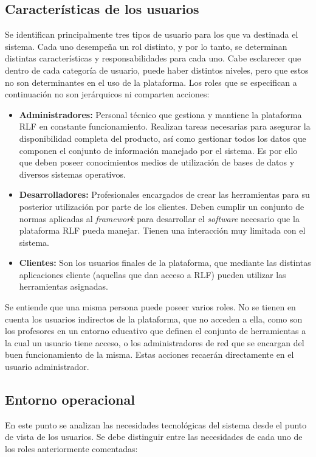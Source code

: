 \subsection{Características de los usuarios}
Se identifican principalmente tres tipos de usuario para los que va 
destinada el sistema. Cada uno desempeña un rol distinto, y por lo 
tanto, se determinan distintas características y responsabilidades 
para cada uno. Cabe esclarecer que dentro de cada categoría de 
usuario, puede haber distintos niveles, pero que estos no son 
determinantes en el uso de la plataforma. Los roles que se especifican 
a continuación no son jerárquicos ni comparten acciones:

\begin{itemize}
\item \textbf{Administradores:} Personal técnico que gestiona y 
mantiene la plataforma RLF en constante funcionamiento. Realizan 
tareas necesarias para asegurar la disponibilidad completa del 
producto, así como gestionar todos los datos que componen el conjunto 
de información manejado por el sistema. Es por ello que deben poseer 
conocimientos medios de utilización de bases de datos y diversos 
sistemas operativos.
\item \textbf{Desarrolladores:} Profesionales encargados de crear las 
herramientas para su posterior utilización por parte de los clientes. 
Deben cumplir un conjunto de normas aplicadas al \emph{framework} para 
desarrollar el \emph{software} necesario que la plataforma RLF pueda 
manejar. Tienen una interacción muy limitada con el sistema.
\item \textbf{Clientes:} Son los usuarios finales de la plataforma, 
que mediante las distintas aplicaciones cliente (aquellas que dan 
acceso a RLF) pueden utilizar las herramientas asignadas.
\end{itemize}

Se entiende que una misma persona puede poseer varios roles. No se 
tienen en cuenta los usuarios indirectos de la plataforma, que no 
acceden a ella, como son los profesores en un entorno educativo que 
definen el conjunto de herramientas a la cual un usuario tiene acceso, 
o los administradores de red que se encargan del buen funcionamiento 
de la misma. Estas acciones recaerán directamente en el usuario 
administrador. 

\subsection{Entorno operacional}
En este punto se analizan las necesidades tecnológicas del sistema 
desde el punto de vista de los usuarios. Se debe distinguir entre las 
necesidades de cada uno de los roles anteriormente comentadas:

